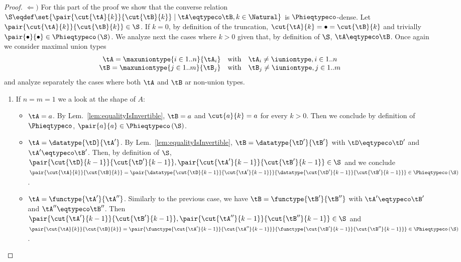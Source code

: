 \begin{proof}
$\Leftarrow)$ For this part of the proof we show that the converse relation $\S
\eqdef \set{\pair{\cut{\tA}{k}}{\cut{\tB}{k}} \mathrel| \tA \eqtypeco \tB, k
\in \Natural}$ is $\Phieqtypeco$-dense. Let $\pair{\cut{\tA}{k}}{\cut{\tB}{k}}
\in \S$. If $k = 0$, by definition of the truncation, $\cut{\tA}{k} = \bullet =
\cut{\tB}{k}$ and trivially $\pair{\bullet}{\bullet} \in
\Phieqtypeco\left(\S\right)$. We analyze next the cases where $k > 0$ given
that, by definition of $\S$, $\tA \eqtypeco \tB$. Once again we consider
maximal union types $$
\begin{array}{r@{\quad\text{with}\quad}l}
\tA = \maxuniontype{i \in 1..n}{\tA_i} & \tA_i \neq \iuniontype, i \in 1..n \\
\tB = \maxuniontype{j \in 1..m}{\tB_j} & \tB_j \neq \iuniontype, j \in 1..m
\end{array} $$ and analyze separately the cases where both $\tA$ and $\tB$ ar
non-union types.
\begin{enumerate}
  \item If $n = m = 1$ we a look at the shape of $A$:
  \begin{itemize}
    \item $\tA = a$. By Lem.~\ref{lem:equalityIsInvertible}, $\tB = a$ and
    $\cut{a}{k} = a$ for every $k > 0$. Then we conclude by definition of
    $\Phieqtypeco$, $\pair{a}{a} \in \Phieqtypeco\left(\S\right)$.
    
    \item $\tA = \datatype{\tD}{\tA'}$. By Lem.~\ref{lem:equalityIsInvertible},
    $\tB = \datatype{\tD'}{\tB'}$ with $\tD \eqtypeco \tD'$ and $\tA' \eqtypeco
    \tB'$. Then, by definition of $\S$,
    $\pair{\cut{\tD}{k-1}}{\cut{\tD'}{k-1}},
    \pair{\cut{\tA'}{k-1}}{\cut{\tB'}{k-1}} \in \S$ and we conclude
    $\pair{\cut{\tA}{k}}{\cut{\tB}{k}} =
    \pair{\datatype{\cut{\tD}{k-1}}{\cut{\tA'}{k-1}}}{\datatype{\cut{\tD'}{k-1}}{\cut{\tB'}{k-1}}}
    \in \Phieqtypeco\left(\S\right)$.
    
    \item $\tA = \functype{\tA'}{\tA''}$. Similarly to the previous case, we
    have $\tB = \functype{\tB'}{\tB''}$ with $\tA' \eqtypeco \tB'$ and $\tA''
    \eqtypeco \tB''$. Then $\pair{\cut{\tA'}{k-1}}{\cut{\tB'}{k-1}},
    \pair{\cut{\tA''}{k-1}}{\cut{\tB''}{k-1}} \in \S$ and
    $\pair{\cut{\tA}{k}}{\cut{\tB}{k}} =
    \pair{\functype{\cut{\tA'}{k-1}}{\cut{\tA''}{k-1}}}{\functype{\cut{\tB'}{k-1}}{\cut{\tB''}{k-1}}}
    \in \Phieqtypeco\left(\S\right)$.
  \end{itemize}
  

\end{enumerate}
\end{proof}
